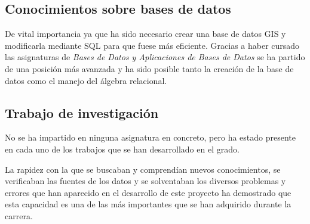 \subsection{Conocimientos sobre bases de datos}
De vital importancia ya que ha sido necesario crear una base de datos GIS y modificarla mediante SQL para que fuese más eficiente.
Gracias a haber cursado las asignaturas de \textit{Bases de Datos y Aplicaciones de Bases de Datos} se ha partido de una posición más avanzada y ha sido posible tanto la creación de la base de datos como el manejo del álgebra relacional.

\subsection{Trabajo de investigación}
No se ha impartido en ninguna asignatura en concreto, pero ha estado presente en cada uno de los trabajos que se han desarrollado en el grado.

La rapidez con la que se buscaban y comprendían nuevos conocimientos, se verificaban las fuentes de los datos y se solventaban los diversos problemas y errores que han aparecido en el desarrollo de este proyecto ha demostrado que esta capacidad es una de las más importantes que se han adquirido durante la carrera. 
